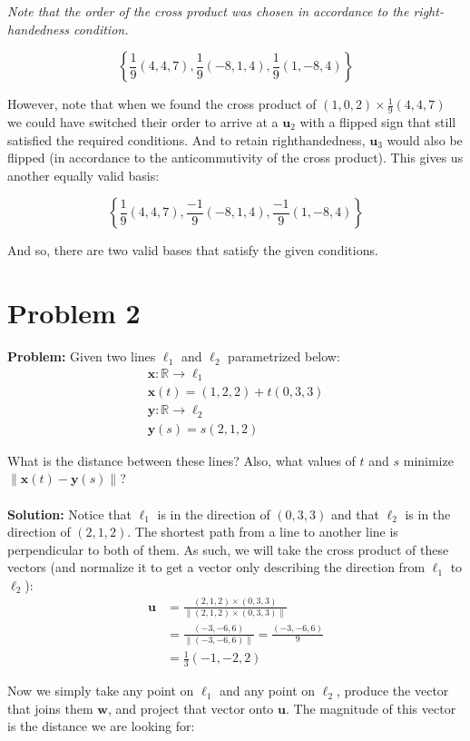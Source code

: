 \documentclass{article}
\begin{document}
\textit{Note that the order of the cross product was chosen in accordance to the right-handedness condition.}

$$\left\{\frac{1}{9}(4,4,7),\frac{1}{9}(-8,1,4),\frac{1}{9}(1,-8,4)\right\}$$

However, note that when we found the cross product of $(1,0,2)\times\frac{1}{9}(4,4,7)$ we could have switched their order to arrive at a $\mathbf{u}_2$ with a flipped sign that still satisfied the required conditions. And to retain righthandedness, $\mathbf{u}_3$ would also be flipped (in accordance to the anticommutivity of the cross product). This gives us another equally valid basis:

$$\left\{\frac{1}{9}(4,4,7),\frac{-1}{9}(-8,1,4),\frac{-1}{9}(1,-8,4)\right\}$$

And so, there are two valid bases that satisfy the given conditions.

\section{Problem 2}
\textbf{Problem:} Given two lines $\ell_1$ and $\ell_2$ parametrized below:
\begin{gather*}
\mathbf{x}:\mathbb{R}\to\ell_1\\
\mathbf{x}(t)=(1,2,2)+t(0,3,3)\\
\mathbf{y}:\mathbb{R}\to\ell_2\\
\mathbf{y}(s)=s(2,1,2)
\end{gather*}

What is the distance between these lines? Also, what values of $t$ and $s$ minimize $\|\mathbf{x}(t)-\mathbf{y}(s)\|$?
\\\\
\textbf{Solution:} Notice that $\ell_1$ is in the direction of $(0,3,3)$ and that $\ell_2$ is in the direction of $(2,1,2)$. The shortest path from a line to another line is perpendicular to both of them. As such, we will take the cross product of these vectors (and normalize it to get a vector only describing the direction from $\ell_1$ to $\ell_2$):
\begin{align*}
  \mathbf u&=\frac{(2,1,2)\times(0,3,3)}{\|(2,1,2)\times(0,3,3)\|}\\
  &=\frac{(-3,-6,6)}{\|(-3,-6,6)\|}=\frac{(-3,-6,6)}{9}\\
  &=\frac{1}{3}(-1,-2,2)
\end{align*}

Now we simply take any point on $\ell_1$ and any point on $\ell_2$, produce the vector that joins them $\mathbf w$, and project that vector onto $\mathbf u$. The magnitude of this vector is the distance we are looking for:
\end{document}
